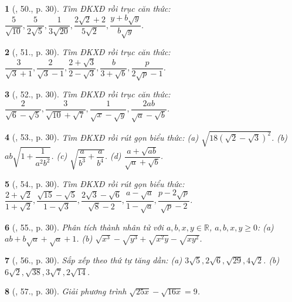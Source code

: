 \documentclass{article}
\newtheorem{baitoan}{}
\begin{document}
\begin{baitoan}[\cite{SGK_Toan_9_tap_1}, 50., p. 30]
	Tìm ĐKXĐ rồi trục căn thức: $\dfrac{5}{\sqrt{10}},\dfrac{5}{2\sqrt{5}},\dfrac{1}{3\sqrt{20}},\dfrac{2\sqrt{2} + 2}{5\sqrt{2}},\dfrac{y + b\sqrt{y}}{b\sqrt{y}}$.
\end{baitoan}

\begin{baitoan}[\cite{SGK_Toan_9_tap_1}, 51., p. 30]
	Tìm ĐKXĐ rồi trục căn thức: $\dfrac{3}{\sqrt{3} + 1},\dfrac{2}{\sqrt{3} - 1},\dfrac{2 + \sqrt{3}}{2 - \sqrt{3}},\dfrac{b}{3 + \sqrt{b}},\dfrac{p}{2\sqrt{p} - 1}$.
\end{baitoan}

\begin{baitoan}[\cite{SGK_Toan_9_tap_1}, 52., p. 30]
	Tìm ĐKXĐ rồi trục căn thức: $\dfrac{2}{\sqrt{6} - \sqrt{5}},\dfrac{3}{\sqrt{10} + \sqrt{7}},\dfrac{1}{\sqrt{x} - \sqrt{y}},\dfrac{2ab}{\sqrt{a} - \sqrt{b}}$.
\end{baitoan}

\begin{baitoan}[\cite{SGK_Toan_9_tap_1}, 53., p. 30]
	Tìm ĐKXĐ rồi rút gọn biểu thức: (a) $\sqrt{18(\sqrt{2} - \sqrt{3})^2}$. (b) $ab\sqrt{1 + \dfrac{1}{a^2b^2}}$. (c) $\sqrt{\dfrac{a}{b^3} + \dfrac{a}{b^4}}$. (d) $\dfrac{a + \sqrt{ab}}{\sqrt{a} + \sqrt{b}}$.
\end{baitoan}

\begin{baitoan}[\cite{SGK_Toan_9_tap_1}, 54., p. 30]
	Tìm ĐKXĐ rồi rút gọn biểu thức: $\dfrac{2 + \sqrt{2}}{1 + \sqrt{2}},\dfrac{\sqrt{15} - \sqrt{5}}{1 - \sqrt{3}},\dfrac{2\sqrt{3} - \sqrt{6}}{\sqrt{8} - 2},\dfrac{a - \sqrt{a}}{1 - \sqrt{a}},\dfrac{p - 2\sqrt{p}}{\sqrt{p} - 2}$.
\end{baitoan}

\begin{baitoan}[\cite{SGK_Toan_9_tap_1}, 55., p. 30]
	Phân tích thành nhân tử với $a,b,x,y\in\mathbb{R}$, $a,b,x,y\ge0$: (a) $ab + b\sqrt{a} + \sqrt{a} + 1$. (b) $\sqrt{x^3} - \sqrt{y^3} + \sqrt{x^2y} - \sqrt{xy^2}$.
\end{baitoan}

\begin{baitoan}[\cite{SGK_Toan_9_tap_1}, 56., p. 30]
	Sắp xếp theo thứ tự tăng dần: (a) $3\sqrt{5},2\sqrt{6},\sqrt{29},4\sqrt{2}$. (b) $6\sqrt{2},\sqrt{38},3\sqrt{7},2\sqrt{14}$.
\end{baitoan}

\begin{baitoan}[\cite{SGK_Toan_9_tap_1}, 57., p. 30]
	Giải phương trình $\sqrt{25x} - \sqrt{16x} = 9$.
\end{baitoan}
\end{document}
